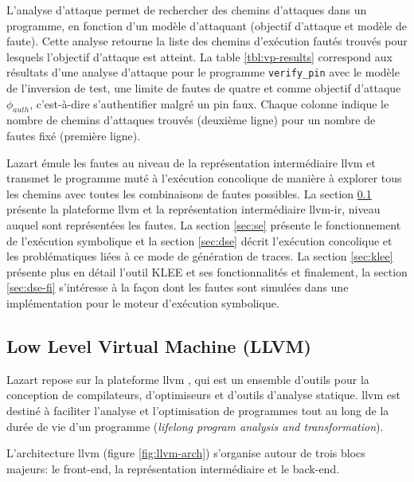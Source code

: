         L'analyse d'attaque permet de rechercher des chemins d'attaques dans un programme, en fonction d'un modèle d'attaquant (objectif d'attaque et modèle de faute). Cette analyse retourne la liste des chemins d'exécution fautés trouvés pour lesquels l'objectif d'attaque est atteint. La table \ref{tbl:vp-results} correspond aux résultats d'une analyse d'attaque pour le programme \texttt{verify\_pin} avec le modèle de l'inversion de test, une limite de fautes de quatre et comme objectif d'attaque $\phi_{auth}$, c'est-à-dire s'authentifier malgré un \gls{pin} faux. Chaque colonne indique le nombre de chemins d'attaques trouvés (deuxième ligne) pour un nombre de fautes fixé (première ligne).
     
        Lazart émule les fautes au niveau de la représentation intermédiaire \gls{llvm} et transmet le programme muté à l'exécution concolique de manière à explorer tous les chemins avec toutes les combinaisons de fautes possibles.
        La section \ref{sec:llvm} présente la plateforme \gls{llvm} et la représentation intermédiaire \gls{llvm-ir}, niveau auquel sont représentées les fautes.
        La section \ref{sec:se} présente le fonctionnement de l'exécution symbolique et la section \ref{sec:dse} décrit l'exécution concolique et les problématiques liées à ce mode de génération de traces. La section \ref{sec:klee} présente plus en détail l'outil KLEE et ses fonctionnalités et finalement, la section \ref{sec:dse-fi} s'intéresse à la façon dont les fautes sont simulées dans une implémentation pour le moteur d'exécution symbolique.
        
        \subsection{Low Level Virtual Machine (LLVM)}
        \label{sec:llvm}
        
            Lazart repose sur la plateforme \gls{llvm} \cite{llvm}, qui est un ensemble d'outils pour la conception de compilateurs, d'optimiseurs et d'outils d'analyse statique. \gls{llvm} est destiné à faciliter l'analyse et l'optimisation de programmes tout au long de la durée de vie d'un programme (\textit{lifelong program analysis and transformation}).            
            
            L'architecture \gls{llvm} (figure \ref{fig:llvm-arch}) s'organise autour de trois blocs majeurs: le front-end, la représentation intermédiaire et le back-end. 
            

